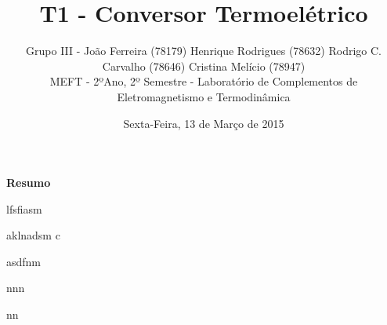\documentclass[9pt]{extarticle}
\renewenvironment{abstract}
 {\small
  \begin{center}
  \bfseries \abstractname\vspace{-.5em}\vspace{0pt}
  \end{center}
  \list{}{
    \setlength{\leftmargin}{0cm}%
    \setlength{\rightmargin}{\leftmargin}%
  }%
  \item\relax}
 {\endlist}
\renewcommand{\abstractname}{Resumo}
\begin{document}
\title {\bf \huge T1 - Conversor Termoelétrico}
\author
{{\small Grupo III - João Ferreira (78179) Henrique Rodrigues (78632) Rodrigo C. Carvalho (78646) Cristina Melício (78947)} \\
{\small MEFT - 2ºAno, 2º Semestre - Laboratório de Complementos de Eletromagnetismo e Termodinâmica}}
\date{{\small Sexta-Feira, 13 de Março de 2015}}
\maketitle

\begin{abstract}
\par lfsfiasm

aklnadsm c


asdfnm 

nnn

nn
\end{abstract}
\end{document}
